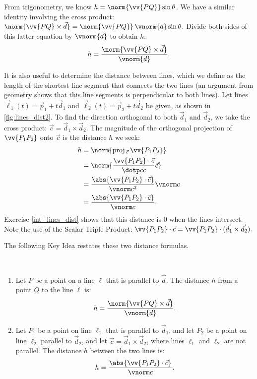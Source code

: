 From trigonometry, we know $h = \norm{\vv{PQ}}\sin\theta$. We have a similar identity involving the cross product: $\norm{\vv{PQ}\times \vec d} = \norm{\vv{PQ}}\, \vnorm{d}\sin\theta.$ Divide both sides of this latter equation by $\vnorm{d}$ to obtain $h$:
\begin{equation}
h = \frac{\norm{\vv{PQ}\times \vec d}}{\vnorm{d}}.
\label{eq:lines2}
\end{equation}


It is also useful to determine the distance between lines, which we define as the length of the shortest line segment that connects the two lines (an argument from geometry shows that this line segments is perpendicular to both lines). Let lines $\vec\ell_1(t) = \vec p_1 + t\vec d_1$ and $\vec\ell_2(t) = \vec p_2 + t\vec d_2$ be given, as shown in \autoref{fig:lines_dist2}. To find the direction orthogonal to both $\vec d_1$ and $\vec d_2$, we take the cross product: $\vec c = \vec d_1\times \vec d_2$. The magnitude of the orthogonal projection of $\vv{P_1P_2}$ onto $\vec c$ is the distance $h$ we seek:
\begin{align*}
	h&=	\norm{\text{proj}\,_{\vec c}\,\vv{P_1P_2}}\\
	&= \norm{\frac{\vv{P_1P_2}\cdot\vec c}{\dotp cc}\vec c}\\
	&=\frac{\abs{\vv{P_1P_2}\cdot \vec c}}{\vnorm c^2}\vnorm c\\
	&=\frac{\abs{\vv{P_1P_2}\cdot \vec c}}{\vnorm c}.
\end{align*}
Exercise \ref{int_lines_dist} shows that this distance is 0 when the lines intersect. Note the use of the Scalar Triple Product: $\vv{P_1P_2}\cdot\vec c = \vv{P_1P_2}\cdot (\vec d_1\times \vec d_2).$

The following Key Idea restates these two distance formulas.

{
\mbox{}\\[-2\baselineskip]\begin{enumerate}
	\item Let $P$ be a point on a line $\ell$ that is parallel to $\vec d$. The distance $h$ from a point $Q$ to the line $\ell$ is:
	\[h =\frac{\norm{\vv{PQ}\times \vec d}}{\vnorm{d}}.\]
	\item	Let $P_1$ be a point on line $\ell_1$ that is parallel to $\vec d_1$, and let $P_2$ be a point on line $\ell_2$ parallel to $\vec d_2$, and let $\vec c = \vec d_1\times \vec d_2$, where lines $\ell_1$ and $\ell_2$ are not parallel. The distance $h$ between the two lines is:
	\[h=\frac{\abs{\vv{P_1P_2}\cdot \vec c}}{\vnorm c}.\]
\end{enumerate}}

